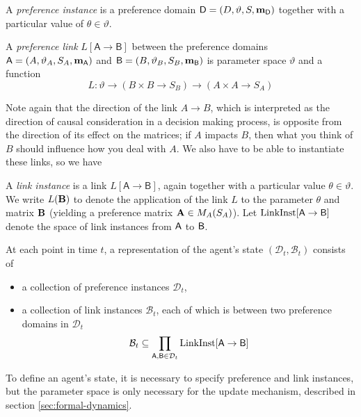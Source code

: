 \documentclass{article}
\begin{document}
	\begin{defn}
		 A \emph{preference instance} is a preference domain $\mathsf D = (D, \vartheta, S, \mathbf m_{\mathsf D})$ together with a particular value of $\theta \in \vartheta$.
		 
	\end{defn}

	\begin{defn}
		A \emph{preference link} $L [\mathsf A \to \mathsf B]$ between the preference domains $\mathsf A = (A, \vartheta_A, S_A, \mathbf m_{\mathsf A})$ and $\mathsf B = (B, \vartheta_B, S_B, \mathbf m_{\mathsf B})$ is parameter space $\vartheta$ and a function 
		\[ L : \vartheta \to (B \times B \to S_B) \to (A \times A \to S_A)  \]
	\end{defn}
	Note again that the direction of the link $A \to B$, which is interpreted as the direction of causal consideration in a decision making process, is opposite from the direction of its effect on the matrices; if $A$ impacts $B$, then what you think of $B$ should influence how you deal with $A$. We also have to be able to instantiate these links, so we have
	\begin{defn}
		 A \emph{link instance} is a link $L [\mathsf A \to \mathsf B]$, again together with a particular value $\theta \in \vartheta$. We write $L ( \mathbf B )$ to denote the application of the link $L$ to the parameter $\theta $ and matrix $\mathbf B$ (yielding a preference matrix $\mathbf A \in M_A(S_A)$). 
		 Let $\mathrm{LinkInst}[{\sf A \to B}]$ denote the space of link instances from $\sf A$ to $\sf B$.
	\end{defn}
	
	
	At each point in time $t$, a representation of the agent's state $(\mathcal D_t, \mathcal B_t)$ consists of 
	

	\begin{itemize}[nosep]
		\item a collection of preference instances $\mathcal D_t$, %
		
		\item a collection of link instances $\mathcal B_t$, each of which is between two preference domains in $\mathcal D_t$
		\[  \mathcal B_t \subseteq \prod_{{\sf A, B} \in \mathcal D_t}  \mathrm{LinkInst}[{\sf A \to B}] \]	
	\end{itemize}
	
		
	\begin{remark}
		To define an agent's state, it is necessary to specify preference and link instances, but the parameter space is only necessary for the update mechanism, described in section \ref{sec:formal-dynamics}.
	\end{remark}
 
\end{document}
